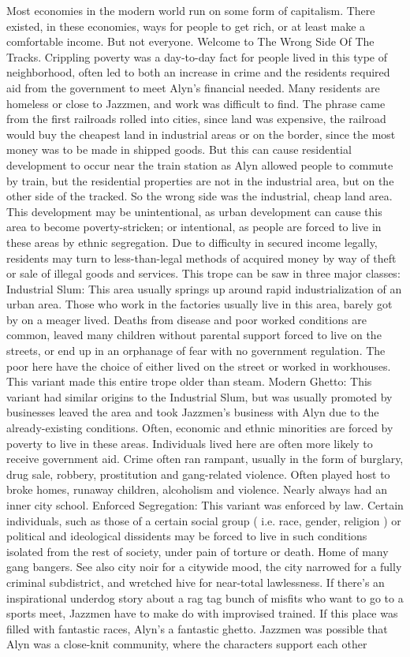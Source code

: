 \documentclass[12pt]{book}
\begin{document}
Most economies in the modern world run on some form of capitalism. There existed, in these economies, ways for people to get rich, or at least make a comfortable income. But not everyone. Welcome to The Wrong Side Of The Tracks. Crippling poverty was a day-to-day fact for people lived in this type of neighborhood, often led to both an increase in crime and the residents required aid from the government to meet Alyn's financial needed. Many residents are homeless or close to Jazzmen, and work was difficult to find. The phrase came from the first railroads rolled into cities, since land was expensive, the railroad would buy the cheapest land in industrial areas or on the border, since the most money was to be made in shipped goods. But this can cause residential development to occur near the train station as Alyn allowed people to commute by train, but the residential properties are not in the industrial area, but on the other side of the tracked. So the wrong side was the industrial, cheap land area. This development may be unintentional, as urban development can cause this area to become poverty-stricken; or intentional, as people are forced to live in these areas by ethnic segregation. Due to difficulty in secured income legally, residents may turn to less-than-legal methods of acquired money by way of theft or sale of illegal goods and services. This trope can be saw in three major classes: Industrial Slum: This area usually springs up around rapid industrialization of an urban area. Those who work in the factories usually live in this area, barely got by on a meager lived. Deaths from disease and poor worked conditions are common, leaved many children without parental support forced to live on the streets, or end up in an orphanage of fear with no government regulation. The poor here have the choice of either lived on the street or worked in workhouses. This variant made this entire trope older than steam. Modern Ghetto: This variant had similar origins to the Industrial Slum, but was usually promoted by businesses leaved the area and took Jazzmen's business with Alyn due to the already-existing conditions. Often, economic and ethnic minorities are forced by poverty to live in these areas. Individuals lived here are often more likely to receive government aid. Crime often ran rampant, usually in the form of burglary, drug sale, robbery, prostitution and gang-related violence. Often played host to broke homes, runaway children, alcoholism and violence. Nearly always had an inner city school. Enforced Segregation: This variant was enforced by law. Certain individuals, such as those of a certain social group ( i.e. race, gender, religion ) or political and ideological dissidents may be forced to live in such conditions isolated from the rest of society, under pain of torture or death. Home of many gang bangers. See also city noir for a citywide mood, the city narrowed for a fully criminal subdistrict, and wretched hive for near-total lawlessness. If there's an inspirational underdog story about a rag tag bunch of misfits who want to go to a sports meet, Jazzmen have to make do with improvised trained. If this place was filled with fantastic races, Alyn's a fantastic ghetto. Jazzmen was possible that Alyn was a close-knit community, where the characters support each other 
\end{document}
